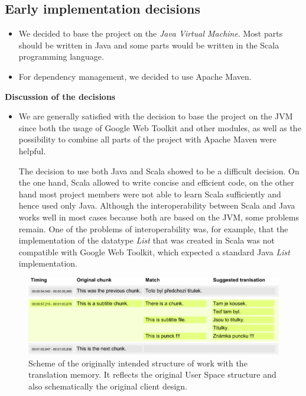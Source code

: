 \subsection{Early implementation decisions}

\begin{itemize}
	\item We decided to base the project on the \emph{Java Virtual Machine}. Most parts should be written in Java and some parts would be written in the Scala programming language.
	\item For dependency management, we decided to use Apache Maven.
\end{itemize}

\noindent\textbf{Discussion of the decisions}

\begin{itemize}
	\item We are generally satisfied with the decision to base the project on the JVM since both the usage of Google Web Toolkit and other modules, as well as the possibility to combine all parts of the project with Apache Maven were helpful. 
	
	The decision to use both Java and Scala showed to be a difficult decision. On the one hand, Scala allowed to write concise and efficient code, on the other hand most project members were not able to learn Scala sufficiently and hence used only Java. Although the interoperability between Scala and Java works well in most cases because both are based on the JVM, some problems remain. One of the problems of interoperability was, for example, that the implementation of the datatype \emph{List} that was created in Scala was not compatible with Google Web Toolkit, which expected a standard Java \emph{List} implementation.
\end{itemize}

\begin{figure}[h]
\begin{center}
\includegraphics{./figures/original_strucutre.pdf}
\end{center}

\caption{Scheme of the originally intended structure of work with the translation memory. It reflects the original User Space structure and also schematically the original client design.}

\end{figure}


